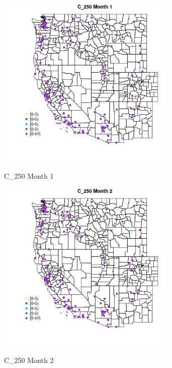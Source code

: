\begin{figure} 
\centering  
\includegraphics[width=0.77\textwidth]{Code_Outputs/Report_ML_input_PM25_Step4_part_e_de_duplicated_aves_MapObsMo1C_250.jpg} 
\caption{\label{fig:Report_ML_input_PM25_Step4_part_e_de_duplicated_avesMapObsMo1C_250}C_250 Month 1} 
\end{figure} 
 

\begin{figure} 
\centering  
\includegraphics[width=0.77\textwidth]{Code_Outputs/Report_ML_input_PM25_Step4_part_e_de_duplicated_aves_MapObsMo2C_250.jpg} 
\caption{\label{fig:Report_ML_input_PM25_Step4_part_e_de_duplicated_avesMapObsMo2C_250}C_250 Month 2} 
\end{figure} 
 

